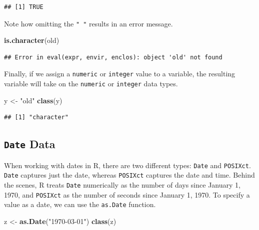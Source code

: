 \documentclass[]{book}
\newenvironment{Shaded}{\begin{snugshade}}{\end{snugshade}}
\newcommand{\KeywordTok}[1]{\textcolor[rgb]{0.13,0.29,0.53}{\textbf{#1}}}
\newcommand{\StringTok}[1]{\textcolor[rgb]{0.31,0.60,0.02}{#1}}
\newcommand{\NormalTok}[1]{#1}
\begin{document}
\begin{verbatim}
## [1] TRUE
\end{verbatim}

Note how omitting the \texttt{"\ "} results in an error message.

\begin{Shaded}
\begin{Highlighting}[]
\KeywordTok{is.character}\NormalTok{(old)}
\end{Highlighting}
\end{Shaded}

\begin{verbatim}
## Error in eval(expr, envir, enclos): object 'old' not found
\end{verbatim}

Finally, if we assign a \texttt{numeric} or \texttt{integer} value to a
variable, the resulting variable will take on the \texttt{numeric} or
\texttt{integer} data types.

\begin{Shaded}
\begin{Highlighting}[]
\NormalTok{y <-}\StringTok{ "old"}
\KeywordTok{class}\NormalTok{(y)}
\end{Highlighting}
\end{Shaded}

\begin{verbatim}
## [1] "character"
\end{verbatim}

\subsection{\texorpdfstring{\texttt{Date}
Data}{Date Data}}\label{date-data}

When working with dates in R, there are two different types:
\texttt{Date} and \texttt{POSIXct}. \texttt{Date} captures just the
date, whereas \texttt{POSIXct} captures the date and time. Behind the
scenes, R treats \texttt{Date} numerically as the number of days since
January 1, 1970, and \texttt{POSIXct} as the number of seconds since
January 1, 1970. To specify a value as a date, we can use the
\texttt{as.Date} function.

\begin{Shaded}
\begin{Highlighting}[]
\NormalTok{z <-}\StringTok{ }\KeywordTok{as.Date}\NormalTok{(}\StringTok{"1970-03-01"}\NormalTok{)}
\KeywordTok{class}\NormalTok{(z)}
\end{Highlighting}
\end{Shaded}
\end{document}
